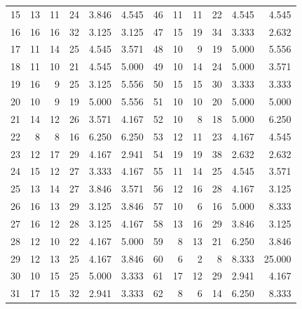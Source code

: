 \begin{table}[htbp]
\begin{tabular}{@{}rrrrrr@{\hspace{9pt}}rrrrrr@{}}
15 & 13 & 11 & 24 & 3.846 & 4.545 & 46 & 11 & 11 & 22 & 4.545 & 4.545\\
16 & 16 & 16 & 32 & 3.125 & 3.125 & 47 & 15 & 19 & 34 & 3.333 & 2.632\\
17 & 11 & 14 & 25 & 4.545 & 3.571 & 48 & 10 & 9 & 19 & 5.000 & 5.556\\
18 & 11 & 10 & 21 & 4.545 & 5.000 & 49 & 10 & 14 & 24 & 5.000 & 3.571\\
19 & 16 & 9 & 25 & 3.125 & 5.556 & 50 & 15 & 15 & 30 & 3.333 & 3.333\\
20 & 10 & 9 & 19 & 5.000 & 5.556 & 51 & 10 & 10 & 20 & 5.000 & 5.000\\
21 & 14 & 12 & 26 & 3.571 & 4.167 & 52 & 10 & 8 & 18 & 5.000 & 6.250\\
22 & 8 & 8 & 16 & 6.250 & 6.250 & 53 & 12 & 11 & 23 & 4.167 & 4.545\\
23 & 12 & 17 & 29 & 4.167 & 2.941 & 54 & 19 & 19 & 38 & 2.632 & 2.632\\
24 & 15 & 12 & 27 & 3.333 & 4.167 & 55 & 11 & 14 & 25 & 4.545 & 3.571\\
25 & 13 & 14 & 27 & 3.846 & 3.571 & 56 & 12 & 16 & 28 & 4.167 & 3.125\\
26 & 16 & 13 & 29 & 3.125 & 3.846 & 57 & 10 & 6 & 16 & 5.000 & 8.333\\
27 & 16 & 12 & 28 & 3.125 & 4.167 & 58 & 13 & 16 & 29 & 3.846 & 3.125\\
28 & 12 & 10 & 22 & 4.167 & 5.000 & 59 & 8 & 13 & 21 & 6.250 & 3.846\\
29 & 12 & 13 & 25 & 4.167 & 3.846 & 60 & 6 & 2 & 8 & 8.333 & 25.000\\
30 & 10 & 15 & 25 & 5.000 & 3.333 & 61 & 17 & 12 & 29 & 2.941 & 4.167\\
31 & 17 & 15 & 32 & 2.941 & 3.333 & 62 & 8 & 6 & 14 & 6.250 & 8.333\\
\bottomrule
\end{tabular}
\end{table}

